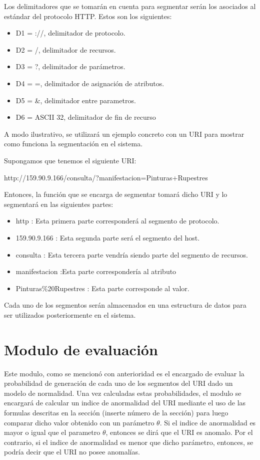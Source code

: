 Los delimitadores que se tomarán en cuenta para segmentar serán los asociados al estándar del protocolo HTTP. Estos son los siguientes:

\begin{itemize}
\item D1 = ://, delimitador de protocolo.
\item D2 = /, delimitador de recursos.
\item D3 = ?, delimitador de parámetros.
\item D4 = =, delimitador de asignación de atributos.
\item D5 = \&, delimitador entre parametros.
\item D6 = ASCII 32, delimitador de fin de recurso
\end{itemize}

A modo ilustrativo, se utilizará un ejemplo concreto con un URI para mostrar como funciona la segmentación en el sistema.

Supongamos que tenemos el siguiente URI:

http://159.90.9.166/consulta/?manifestacion=Pinturas+Rupestres

Entonces, la función que se encarga de segmentar tomará dicho URI y lo segmentará en las siguientes partes:

\begin{itemize}
\item http : Esta primera parte corresponderá al segmento de protocolo. 
\item 159.90.9.166 : Esta segunda parte será el segmento del host. 
\item consulta : Esta tercera parte vendría siendo parte del segmento de recursos.
\item manifestacion :Esta parte correspondería al atributo
\item Pinturas\%20Rupestres : Esta parte corresponde al valor.  
\end{itemize}

Cada uno de los segmentos serán almacenados en una estructura de datos para ser utilizados posteriormente en el sistema.

\section{Modulo de evaluación}

Este modulo, como se mencionó con anterioridad es el encargado de evaluar la probabilidad de generación de cada uno de los segmentos del URI dado un modelo de normalidad. Una vez calculadas estas probabilidades, el modulo se encargará de calcular un indice de anormalidad del URI mediante el uso de las formulas descritas en la sección (inserte número de la sección) para luego comparar dicho valor obtenido con un parámetro $\theta$. Si el indice de anormalidad es mayor o igual que el parametro $\theta$, entonces se dirá que el URI es anomalo. Por el contrario, si el indice de anormalidad es menor que dicho parámetro, entonces, se podría decir que el URI no posee anomalías.

